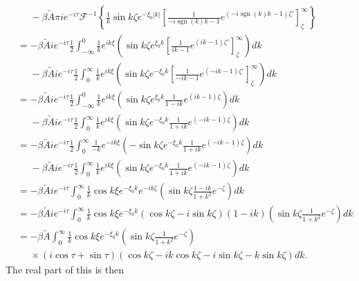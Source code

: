 \documentclass[12pt]{article}
\DeclareMathOperator{\sgn}{sgn}
\begin{document}
\begin{align}
& \phantom{=} -\beta\tilde{A} \pi i e^{-i\tau} \mathcal{F}^{-1}\left\{\frac{1}{k} \sin k \zeta e^{-\xi_0 |k|} \left[ \frac{1}{-i\sgn(k)k-1}e^{\left(-i\sgn(k)k-1\right)\zeta'} \right]_\zeta^\infty \right\} \\
&= -\beta\tilde{A} i e^{-i\tau} \frac{1}{2} \int_{-\infty}^{0} \frac{1}{k} e^{i k \xi} \left(\sin k \zeta e^{\xi_0 k} \left[ \frac{1}{i k-1}e^{\left(ik-1\right)\zeta'} \right]_\zeta^\infty \right) dk \\
&\phantom{=} -\beta \tilde{A} i e^{-i\tau} \frac{1}{2} \int_{0}^{\infty} \frac{1}{k} e^{i k \xi} \left(\sin k \zeta e^{-\xi_0 k} \left[ \frac{1}{-ik-1}e^{\left(-ik-1\right)\zeta'} \right]_\zeta^\infty \right) dk \\
&= -\beta \tilde{A} i e^{-i\tau} \frac{1}{2} \int_{-\infty}^{0} \frac{1}{k} e^{i k \xi} \left(\sin k \zeta e^{\xi_0 k} \frac{1}{1-i k}e^{\left(ik-1\right)\zeta} \right) dk \\
&\phantom{=} -\beta \tilde{A} i e^{-i\tau} \frac{1}{2} \int_{0}^{\infty} \frac{1}{k} e^{i k \xi} \left(\sin k \zeta e^{-\xi_0 k} \frac{1}{1+ik}e^{\left(-ik-1\right)\zeta} \right) dk \\
&= -\beta \tilde{A} i e^{-i\tau} \frac{1}{2} \int_{0}^{\infty} \frac{1}{-k} e^{-i k \xi} \left(-\sin k \zeta e^{-\xi_0 k} \frac{1}{1+i k}e^{\left(-ik-1\right)\zeta} \right) dk \\
&\phantom{=} -\beta \tilde{A} i e^{-i\tau} \frac{1}{2} \int_{0}^{\infty} \frac{1}{k} e^{i k \xi} \left(\sin k \zeta e^{-\xi_0 k} \frac{1}{1+ik}e^{\left(-ik-1\right)\zeta} \right) dk \\
&= -\beta \tilde{A}i e^{-i\tau} \int_{0}^{\infty} \frac{1}{k} \cos k\xi e^{-\xi_0 k} e^{-ik\zeta} \left(\sin k \zeta \frac{1-ik}{1+k^2}e^{-\zeta} \right) dk \\
&= -\beta \tilde{A}i e^{-i\tau} \int_{0}^{\infty} \frac{1}{k} \cos k\xi e^{-\xi_0 k} \left(\cos k\zeta - i\sin k \zeta\right) \left(1-ik\right)\left(\sin k \zeta \frac{1}{1+k^2}e^{-\zeta} \right) dk \\
&= -\beta \tilde{A} \int_{0}^{\infty} \frac{1}{k} \cos k\xi e^{-\xi_0 k}\left(\sin k \zeta \frac{1}{1+k^2}e^{-\zeta} \right) \\
&\phantom{=}\times \left(i\cos\tau + \sin\tau \right)\left(\cos k\zeta -ik\cos k\zeta - i\sin k\zeta - k\sin k\zeta \right) dk.
\end{align}
The real part of this is then
\end{document}
